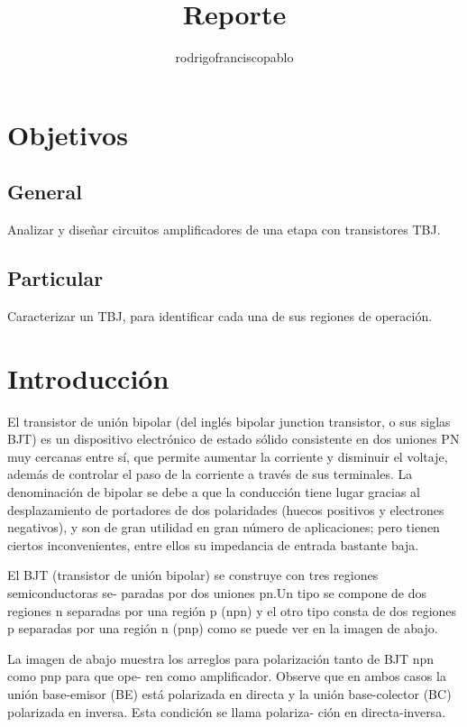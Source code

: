 \documentclass{mylib/reporteConCalif}
\title{Reporte}
\author{rodrigofranciscopablo }
\begin{document}
\coverPage


\section{Objetivos}

\subsection{General}

Analizar y diseñar circuitos amplificadores de una etapa con transistores TBJ.

\subsection{Particular}

Caracterizar un TBJ, para identificar cada una de sus regiones de operación.

\section{Introducción}

El transistor de unión bipolar (del inglés bipolar junction transistor, o sus siglas BJT) es un dispositivo electrónico de estado sólido consistente en dos uniones PN muy cercanas entre sí, que permite aumentar la corriente y disminuir el voltaje, además de controlar el paso de la corriente a través de sus terminales. La denominación de bipolar se debe a que la conducción tiene lugar gracias al desplazamiento de portadores de dos polaridades (huecos positivos y electrones negativos), y son de gran utilidad en gran número de aplicaciones; pero tienen ciertos inconvenientes, entre ellos su impedancia de entrada bastante baja.

El BJT (transistor de unión bipolar) se construye con tres regiones semiconductoras se-
paradas por dos uniones pn.Un tipo se compone de dos regiones n separadas por
una región p (npn) y el otro tipo consta de dos regiones p separadas por una región n (pnp) como se puede ver en la imagen de abajo.


La imagen de abajo muestra los arreglos para polarización tanto de BJT npn como pnp para que ope-
ren como amplificador. Observe que en ambos casos la unión base-emisor (BE) está polarizada
en directa y la unión base-colector (BC) polarizada en inversa. Esta condición se llama polariza-
ción en directa-inversa.
\end{document}
